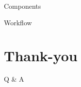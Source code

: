 \documentclass[aspectratio=169, notes]{beamer}
\begin{document}
\begin{frame}{Components}
\end{frame}

\begin{frame}{Workflow}
\end{frame}

\section{Thank-you}

\begin{frame}
	\begin{center}
		\Large{Q \& A}
	\end{center}
\end{frame}
\end{document}

